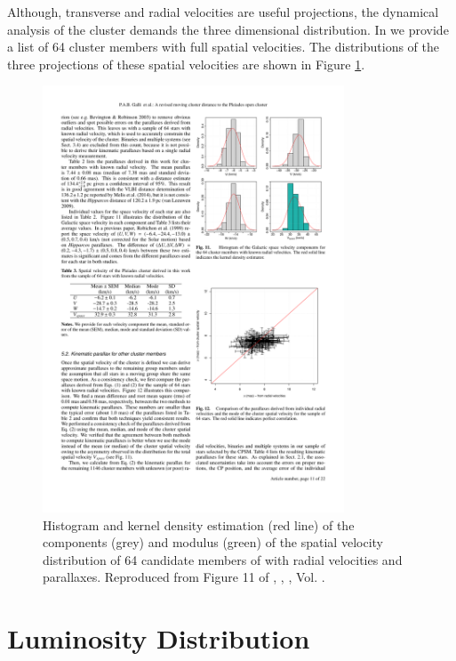 Although, transverse and radial velocities are useful projections, the dynamical analysis of the cluster demands the three dimensional distribution. In \citet{Galli2017} we provide a list of 64 cluster members with full spatial velocities. The distributions of the three projections of these spatial velocities are shown in Figure \ref{fig:velocityGalli}.

\begin{figure}[ht!]
\begin{center}
\includegraphics[width=0.8\textwidth]{background/Figures/F11_Galli2017.pdf}
\caption{Histogram and kernel density estimation (red line) of the components (grey) and modulus (green) of the spatial velocity distribution of 64 candidate members of \citet{Galli2017} with radial velocities and parallaxes. Reproduced from Figure 11 of \citet{Galli2017}, \textit{}, , Vol. .}
\label{fig:velocityGalli}
\end{center}
\end{figure}

\section{Luminosity Distribution}

